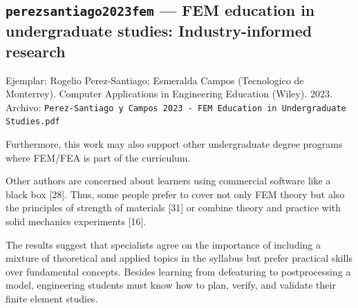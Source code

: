 \documentclass[11pt,a4paper]{article}
\newcommand{\campo}[1]{\textcolor{gris}{\footnotesize #1}}
\begin{document}
\subsection{\texttt{perezsantiago2023fem} --- FEM education in undergraduate studies: Industry-informed research}
{\footnotesize\campo{Ejemplar:} Rogelio Perez-Santiago; Esmeralda Campos (Tecnologico de Monterrey). Computer Applications in Engineering Education (Wiley). 2023. \campo{Archivo:} \texttt{Perez-Santiago y Campos 2023 - FEM Education in Undergraduate Studies.pdf}\par}\vspace{4pt}
\vspace{3pt}\noindent{\small\textbf{p.\ 1160} \quad \campo{La ensenanza del MEF forma parte del nucleo curricular de las carreras de ingenieria (01\_introduccion.tex, primer parrafo).}}\par
\begin{pasaje}\footnotesize Furthermore, this work may also support other undergraduate degree programs where FEM/FEA is part of the curriculum.\end{pasaje}
\vspace{3pt}\noindent{\small\textbf{p.\ 1160} \quad \campo{El software comercial opera, desde la perspectiva del estudiante, como una caja negra (01\_introduccion.tex, Planteamiento del problema).}}\par
\begin{pasaje}\footnotesize Other authors are concerned about learners using commercial software like a \textquotedbl{}black box\textquotedbl{} [28]. Thus, some people prefer to cover not only FEM theory but also the principles of strength of materials [31] or combine theory and practice with solid mechanics experiments [16].\end{pasaje}
\vspace{3pt}\noindent{\small\textbf{p.\ 1159 (resumen)} \quad \campo{La formacion privilegia las destrezas practicas por encima de los conceptos fundamentales (02\_marco\_teorico.tex:9 y 04\_resultados.tex).}}\par
\begin{pasaje}\footnotesize The results suggest that specialists agree on the importance of including a mixture of theoretical and applied topics in the syllabus but prefer practical skills over fundamental concepts. Besides learning from defeaturing to postprocessing a model, engineering students must know how to plan, verify, and validate their finite element studies.\end{pasaje}
\end{document}
